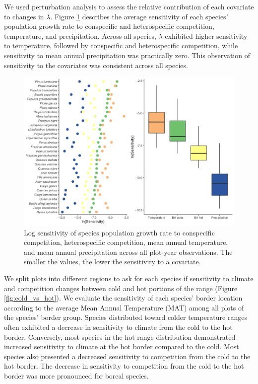 We used perturbation analysis to assess the relative contribution of
each covariate to changes in \(\lambda\). Figure \ref{fig:mean_sens}
describes the average sensitivity of each species' population growth
rate to conspecific and heterospecific competition, temperature, and
precipitation. Across all species, \(\lambda\) exhibited higher
sensitivity to temperature, followed by conspecific and heterospecific
competition, while sensitivity to mean annual precipitation was
practically zero. This observation of sensitivity to the covariates was
consistent across all species.\\

\hypertarget{fig:mean_sens}{%
\begin{figure}
\centering
\includegraphics[width=1\textwidth,height=\textheight]{manuscript/figs/fig-ame-1.png}
\caption[{Log sensitivity of species population growth rate to
conspecific competition, heterospecific competition, mean annual
temperature, and mean annual precipitation across all plot-year
observations.}]{Log sensitivity of species population growth rate to
conspecific competition, heterospecific competition, mean annual
temperature, and mean annual precipitation across all plot-year
observations. The smaller the values, the lower the sensitivity to a
covariate.}
\label{fig:mean_sens}
\end{figure}
}

We split plots into different regions to ask for each species if
sensitivity to climate and competition changes between cold and hot
portions of the range (Figure \ref{fig:cold_vs_hot}). We evaluate the
sensitivity of each species' border location according to the average
Mean Annual Temperature (MAT) among all plots of the species' border
group. Species distributed toward colder temperature ranges often
exhibited a decrease in sensitivity to climate from the cold to the hot
border. Conversely, most species in the hot range distribution
demonstrated increased sensitivity to climate at the hot border compared
to the cold. Most species also presented a decreased sensitivity to
competition from the cold to the hot border. The decrease in sensitivity
to competition from the cold to the hot border was more pronounced for
boreal species.\\

